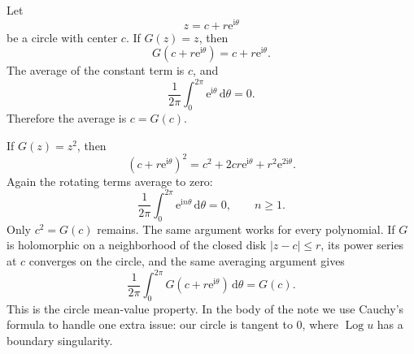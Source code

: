 \documentclass[12pt]{article}
\newcommand{\dd}{\,\mathrm{d}}
\newcommand{\ii}{\mathrm{i}}
\newcommand{\e}{\mathrm{e}}
\newcommand{\Log}{\operatorname{Log}}
\begin{document}
Let
\[
z=c+r\e^{\ii\theta}
\]
be a circle with center \(c\). If \(G(z)=z\), then
\[
G(c+r\e^{\ii\theta})=c+r\e^{\ii\theta}.
\]
The average of the constant term is \(c\), and
\[
\frac1{2\pi}\int_0^{2\pi}\e^{\ii\theta}\dd\theta=0.
\]
Therefore the average is \(c=G(c)\).

If \(G(z)=z^2\), then
\[
(c+r\e^{\ii\theta})^2
=c^2+2cr\e^{\ii\theta}+r^2\e^{2\ii\theta}.
\]
Again the rotating terms average to zero:
\[
\frac1{2\pi}\int_0^{2\pi}\e^{\ii n\theta}\dd\theta=0,
\qquad n\ge1.
\]
Only \(c^2=G(c)\) remains. The same argument works for every polynomial.
If \(G\) is holomorphic on a neighborhood of the closed disk
\(|z-c|\le r\), its power series at \(c\) converges on the circle, and the
same averaging argument gives
\[
\frac1{2\pi}\int_0^{2\pi}
G(c+r\e^{\ii\theta})\dd\theta
=G(c).
\]
This is the circle mean-value property. In the body of the note we use
Cauchy's formula to handle one extra issue: our circle is tangent to
\(0\), where \(\Log u\) has a boundary singularity.
\end{document}
